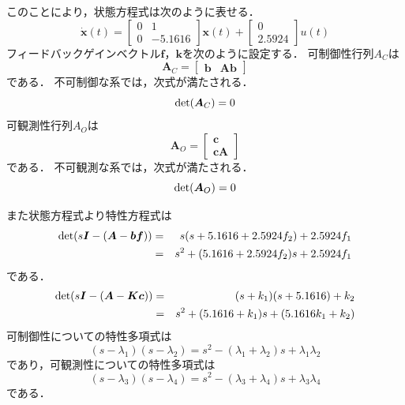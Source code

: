 \documentclass[12pt]{jsarticle}
\begin{document}
このことにより，状態方程式は次のように表せる．
\begin{equation}
  \label{dotx-Ax+bu}
  \dot{\bm x}(t) = \left[\begin{array}{cc}0&1\\0&-5.1616\end{array}\right]{\bm x}(t) + \left[\begin{array}{c}0\\2.5924\end{array}\right]u(t)
\end{equation}
フィードバックゲインベクトル$\bm f$，$\bm k$を次のように設定する．
可制御性行列$A_C$は
\begin{equation}
  \label{}
  \bm A_C = \left[\begin{array}{cc}{\bm b} & {\bm A}{\bm b}\end{array}\right]
\end{equation}
である．
不可制御な系では，次式が満たされる．
\begin{equation}
  {\rm det} ({\bm A_C}) = 0
\end{equation}
可観測性行列$A_O$は
\begin{equation}
  \label{}
  \bm A_O = \left[\begin{array}{c}{\bm c}\\{\bm c}{\bm A}\end{array}\right]
\end{equation}である．
不可観測な系では，次式が満たされる．
\begin{equation}
  {\rm det} ({\bm A_O}) = 0
\end{equation}

また状態方程式より特性方程式は
\begin{eqnarray}
  \label{regulator-poll-equation}
  {\rm det}(s{\bm I} - ({\bm A}-{\bm b}{\bm f}))&=&s(s+5.1616+2.5924f_2)+2.5924f_1 \nonumber \\
  &=& s^2 + (5.1616+2.5924f_2)s + 2.5924f_1
\end{eqnarray}
である．
\begin{eqnarray}
  \label{observer-poll-equation}
  {\rm det}(s{\bm I} - ({\bm A}-{\bm K}{\bm c}))&=& (s+k_1)(s+5.1616)+k_2\nonumber \\
  &=& s^2 + (5.1616+k_1)s + (5.1616k_1 + k_2)
\end{eqnarray}
可制御性についての特性多項式は
\begin{equation}
  \label{lambda=-10regletor}
  (s - \lambda_1)(s - \lambda_2)=s^2-(\lambda_1+\lambda_2)s+\lambda_1 \lambda_2
\end{equation}
であり，可観測性についての特性多項式は
\begin{equation}
  \label{lambda=-10observer}
  (s - \lambda_3)(s - \lambda_4)=s^2-(\lambda_3+\lambda_4)s+\lambda_3 \lambda_4
\end{equation}
である．
\end{document}
